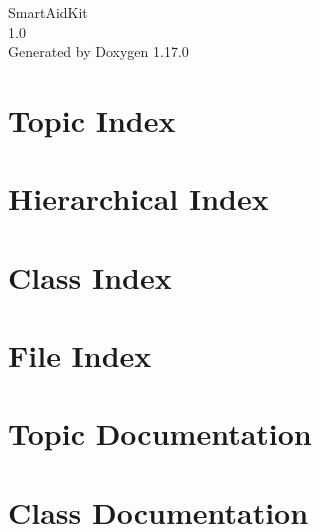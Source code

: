 \documentclass[twoside]{book}
\newcommand{\+}{\discretionary{\mbox{\scriptsize$\hookleftarrow$}}{}{}}
\newcommand{\clearemptydoublepage}{%
    \newpage{\pagestyle{empty}\cleardoublepage}%
  }
\begin{document}
  \raggedbottom
    \hypersetup{pageanchor=false,
                bookmarksnumbered=true,
                pdfencoding=unicode
               }
  \begin{titlepage}
  \vspace*{7cm}
  \begin{center}%
  {\Large Smart\+Aid\+Kit}\\
  [1ex]\large 1.\+0 \\
  \vspace*{1cm}
  {\large Generated by Doxygen 1.17.0}\\
  \end{center}
  \end{titlepage}
  \clearemptydoublepage
  \tableofcontents
  \clearemptydoublepage
  \hypersetup{pageanchor=true}

\chapter{Topic Index}

\chapter{Hierarchical Index}

\chapter{Class Index}

\chapter{File Index}

\chapter{Topic Documentation}





\chapter{Class Documentation}















\end{document}
